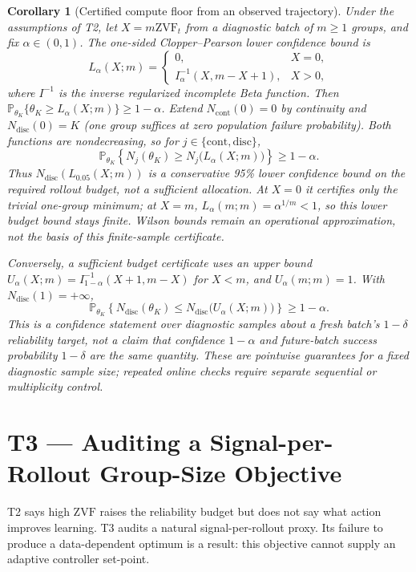 \documentclass[11pt]{article}
\theoremstyle{plain}
\newtheorem{corollary}{Corollary}
\theoremstyle{definition}
\theoremstyle{remark}
\newcommand{\ZVF}{\ensuremath{\mathrm{ZVF}}}
\newcommand{\Prob}{\mathbb{P}}
\newcommand{\1}{\mathbb{1}}
\begin{document}
\begin{corollary}[Certified compute floor from an observed trajectory]
\label{cor:T2-traj}
Under the assumptions of T2, let $X=m\ZVF_t$ from a diagnostic batch of
$m\ge1$ groups, and fix $\alpha\in(0,1)$. The one-sided
Clopper--Pearson lower confidence bound is
\[
L_\alpha(X;m)=
\begin{cases}
0, & X=0,\\
I^{-1}_{\alpha}(X,m-X+1), & X>0,
\end{cases}
\]
where $I^{-1}$ is the inverse regularized incomplete Beta function. Then
$\Prob_{\theta_K}\{\theta_K\ge L_\alpha(X;m)\}\ge1-\alpha$.
Extend $N_{\mathrm{cont}}(0)=0$ by continuity and
$N_{\mathrm{disc}}(0)=K$ (one group suffices at zero population failure
probability). Both functions are nondecreasing, so for
$j\in\{\mathrm{cont},\mathrm{disc}\}$,
\[
\Prob_{\theta_K}\!\left\{N_j(\theta_K)\ge
N_j\big(L_\alpha(X;m)\big)\right\}\ge1-\alpha.
\]
Thus $N_{\mathrm{disc}}(L_{0.05}(X;m))$ is a conservative 95\% lower
confidence bound on the required rollout budget, not a sufficient allocation.
At $X=0$ it certifies only the trivial one-group minimum; at $X=m$,
$L_\alpha(m;m)=\alpha^{1/m}<1$, so this lower budget bound stays finite.
Wilson bounds remain an operational approximation, not the basis of this
finite-sample certificate.

Conversely, a sufficient budget certificate uses an \emph{upper} bound
$U_\alpha(X;m)=I^{-1}_{1-\alpha}(X+1,m-X)$ for $X<m$, and
$U_\alpha(m;m)=1$. With $N_{\mathrm{disc}}(1)=+\infty$,
\[
\Prob_{\theta_K}\!\left\{N_{\mathrm{disc}}(\theta_K)\le
N_{\mathrm{disc}}\big(U_\alpha(X;m)\big)\right\}\ge1-\alpha.
\]
This is a confidence statement over diagnostic samples about a fresh batch's
$1-\delta$ reliability target, not a claim that confidence $1-\alpha$ and
future-batch success probability $1-\delta$ are the same quantity. These
are pointwise guarantees for a fixed diagnostic sample size; repeated online
checks require separate sequential or multiplicity control.
\end{corollary}

\section{T3 --- Auditing a Signal-per-Rollout Group-Size Objective}\label{sec:T3}
T2 says high \ZVF{} raises the reliability budget but does not say what action
improves learning. T3 audits a natural signal-per-rollout proxy. Its failure to
produce a data-dependent optimum is a result: this objective cannot supply an
adaptive controller set-point.
\end{document}

